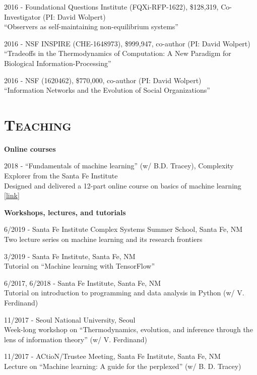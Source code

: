 \documentclass[margin,line,centered]{res}
\begin{document}
\begin{resume}
2016 - Foundational Questions Institute (FQXi-RFP-1622), \$128,319, Co-Investigator (PI: David Wolpert)\\
``Observers as self-maintaining non-equilibrium systems''

2016 - NSF INSPIRE (CHE-1648973), \$999,947, co-author (PI: David Wolpert)\\
``Tradeoffs in the Thermodynamics of Computation: A New Paradigm for Biological Information-Processing''

2016 - NSF (1620462), \$770,000, co-author (PI: David Wolpert)\\
``Information Networks and the Evolution of Social Organizations'' 



\section{\textsc{Teaching}}

\textbf{Online courses}

2018 - ``Fundamentals of machine learning'' (w/ B.D. Tracey), Complexity Explorer from the Santa Fe Institute\\
Designed and delivered a 12-part online course on basics of machine learning {[}\href{https://www.complexityexplorer.org/courses/81-fundamentals-of-machine-learning}{link}{]}

\vspace{5pt}


\textbf{Workshops, lectures, and tutorials}

6/2019 - Santa Fe Institute Complex Systems Summer School, Santa Fe, NM\\
Two lecture series on machine learning and its research frontiers

3/2019 - Santa Fe Institute, Santa Fe, NM\\
Tutorial on ``Machine learning with TensorFlow''

6/2017, 6/2018 - Santa Fe Institute, Santa Fe, NM\\
Tutorial on introduction to programming and data analysis in Python (w/ V. Ferdinand)

11/2017 - Seoul National University, Seoul \\
Week-long workshop on ``Thermodynamics, evolution, and inference through the lens of information theory'' (w/ V. Ferdinand)

11/2017 - ACtioN/Trustee Meeting, Santa Fe Institute, Santa Fe, NM\\
Lecture on ``Machine learning: A guide for the perplexed'' (w/ B. D. Tracey)


\end{resume}
\end{document}
